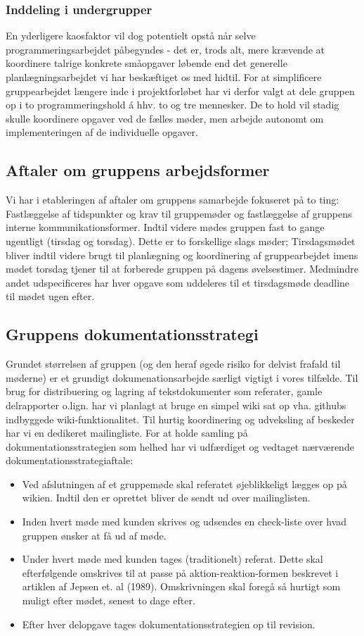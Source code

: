 \documentclass[10pt,a4paper,danish]{article}
\begin{document}
\subsubsection{Inddeling i undergrupper}
En yderligere kaosfaktor vil dog potentielt opstå når selve programmeringsarbejdet påbegyndes - det er, trods alt, mere krævende at koordinere talrige konkrete småopgaver løbende end det generelle planlægningsarbejdet vi har beskæftiget os med hidtil. For at simplificere gruppearbejdet længere inde i projektforløbet har vi derfor valgt at dele gruppen op i to programmeringshold á hhv. to og tre mennesker. De to hold vil stadig skulle koordinere opgaver ved de fælles møder, men arbejde autonomt om implementeringen af de individuelle opgaver. 

\subsection{Aftaler om gruppens arbejdsformer}
Vi har i etableringen af aftaler om gruppens samarbejde fokuseret på to ting: Fastlæggelse af tidspunkter og krav til gruppemøder og fastlæggelse af gruppens interne kommunikationsformer. Indtil videre mødes gruppen fast to gange ugentligt (tirsdag og torsdag). Dette er to forskellige slags møder; Tirsdagsmødet bliver indtil videre brugt til planlægning og koordinering af gruppearbejdet imens mødet torsdag tjener til at forberede gruppen på dagens øvelsestimer. Medmindre andet udspecificeres har hver opgave som uddeleres til et tirsdagsmøde deadline til mødet ugen efter. 

\subsection{Gruppens dokumentationsstrategi}
Grundet størrelsen af gruppen (og den heraf øgede risiko for delvist frafald til møderne) er et grundigt dokumenationsarbejde særligt vigtigt i vores tilfælde. Til brug for distribuering og lagring af tekstdokumenter som referater, gamle delrapporter o.lign. har vi planlagt at bruge en simpel wiki sat op vha. githubs indbyggede wiki-funktionalitet. Til hurtig koordinering og udveksling af beskeder har vi en dedikeret mailingliste. For at holde samling på dokumentationsstrategien som helhed har vi udfærdiget og vedtaget nærværende dokumentationsstrategiaftale:
\begin{itemize}
\item Ved afslutningen af et gruppemøde skal referatet øjeblikkeligt lægges op på wikien. Indtil den er oprettet bliver de 
sendt ud over mailinglisten. 
\item Inden hvert møde med kunden skrives  og udsendes en check-liste over hvad gruppen ønsker at få ud af møde.
\item Under hvert møde med kunden tages (traditionelt) referat. Dette skal efterfølgende omskrives til at passe på aktion-reaktion-formen beskrevet i artiklen af Jepsen et. al (1989). Omskrivningen skal foregå så hurtigt som muligt efter mødet, senest to dage efter. 
\item Efter hver delopgave tages dokumentationsstrategien op til revision. 
\end{itemize}
\end{document}
